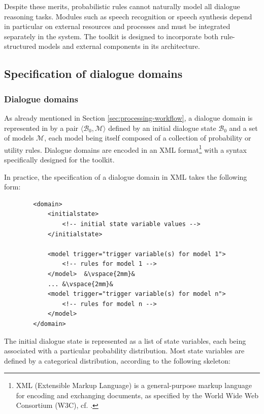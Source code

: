 Despite these merits, probabilistic rules cannot naturally model all dialogue reasoning tasks.  Modules such as speech recognition or speech synthesis depend in particular on external resources and processes and must be integrated separately in the system. The \opendial{} toolkit is designed to incorporate both rule-structured models and external components in its architecture. 
\subsection{Specification of dialogue domains}
\label{sec:domain-specification}

\subsubsection*{Dialogue domains}

As already mentioned in Section \ref{sec:processing-workflow}, a dialogue domain is represented in \opendial{} by a pair $\langle \mathcal{B}_0, \mathcal{M} \rangle$ defined by an initial dialogue state $\mathcal{B}_0$ and a set of models $\mathcal{M}$, each model being itself composed of a collection of probability or utility rules. Dialogue domains are encoded in an XML format\footnote{XML (Extensible Markup Language) is a general-purpose markup language for encoding and exchanging documents, as specified by the World Wide Web Consortium (W3C), cf. .} with a syntax specifically designed for the toolkit. 

In practice, the specification of a dialogue domain in XML takes the following form:
\lstset{language=XML}
\begin{lstlisting}
        <domain> 
            <initialstate>    
                <!-- initial state variable values -->
            </initialstate>

            <model trigger="trigger variable(s) for model 1">
                <!-- rules for model 1 -->
            </model>  &\vspace{2mm}& 
            ... &\vspace{2mm}&
            <model trigger="trigger variable(s) for model n">
                <!-- rules for model n -->
     	    </model>
        </domain>
\end{lstlisting}\vspace{2mm}

The initial dialogue state is represented as a list of state variables, each being associated with a particular probability distribution.  Most state variables are defined by a categorical distribution, according to the following skeleton:

